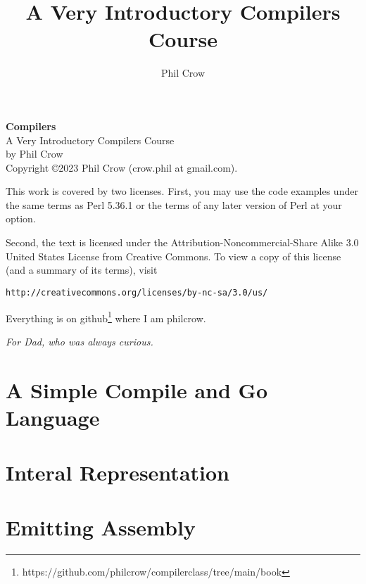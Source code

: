 \documentclass{book}
\begin{document}
\frontmatter
\pagestyle{empty}
\title{A Very Introductory Compilers Course}
\author{Phil Crow}
\date{}
\maketitle

\noindent
\textbf{Compilers} \\
A Very Introductory Compilers Course \\
by Phil Crow \\

\vspace{.2in}
\noindent
Copyright \copyright 2023 Phil Crow (crow.phil at gmail.com).

\noindent
This work is covered by two licenses.  First, you may use the code examples
under the same terms as Perl 5.36.1 or the terms of any later version
of Perl at your option.

Second, the text is licensed under the
Attribution-Noncommercial-Share Alike 3.0 United States License
from Creative Commons.
To view a copy of this license (and a summary of its terms), visit

\begin{verbatim}
http://creativecommons.org/licenses/by-nc-sa/3.0/us/
\end{verbatim}

Everything is on github\footnote{https://github.com/philcrow/compilerclass/tree/main/book} where I am philcrow.

\newpage
\pagestyle{headings}

\begin{center}
\textit{For Dad, who was always curious.}
\end{center}

\tableofcontents



\mainmatter
{}

\part{A Simple Compile and Go Language}










\part{Interal Representation}



%
%

\part{Emitting Assembly}


%
%
%

\appendix


\backmatter
{}
\printindex
\end{document}
